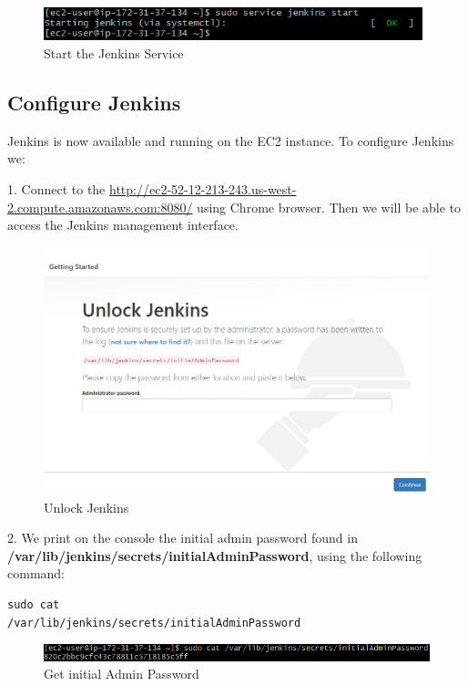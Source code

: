 \documentclass[12pt,a4paper,twoside]{article}
\begin{document}
\begin{figure}[h!]
    \centering
        \includegraphics[width=11cm]{images-aws/21-start-jenkins.png}
        \caption{Start the Jenkins Service}
\end{figure}



\newpage

\subsection{Configure Jenkins}

Jenkins is now available and running on the EC2 instance. To configure Jenkins we:


1. Connect to the \url{http://ec2-52-12-213-243.us-west-2.compute.amazonaws.com:8080/} using Chrome browser.
Then we will be able to access the Jenkins management interface.


\begin{figure}[h!]
    \centering
        \includegraphics[width=15cm]{images-aws/22-unlock-jenkins.png}
        \caption{Unlock Jenkins}
\end{figure}


2. We print on the console the initial admin password found in \textbf{/var/lib/jenkins/secrets/initialAdminPassword}, using the following command:


\begin{verbatim}
sudo cat
/var/lib/jenkins/secrets/initialAdminPassword
\end{verbatim}


\begin{figure}[h!]
    \centering
        \includegraphics[width=13cm]{images-aws/23-get-jenkins-admin-pass.png}
        \caption{Get initial Admin Password}
\end{figure}
\end{document}
